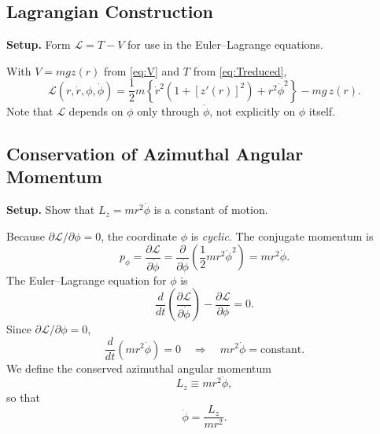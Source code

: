 \documentclass[11pt,letterpaper]{article}
\newcommand{\parhead}[1]{\par\medskip\noindent\textbf{#1}\ignorespaces}
\begin{document}
\subsection{Lagrangian Construction}
\label{sec:lagrangian}

\parhead{Setup.}
Form $\mathcal{L}=T-V$ for use in the Euler--Lagrange equations.

With $V=mgz(r)$ from \eqref{eq:V} and $T$ from \eqref{eq:Treduced},
\begin{equation}\label{eq:Lagrangian}
    \mathcal{L}(r,\dot{r},\phi,\dot{\phi})
    = \frac{1}{2}m\left\{\dot{r}^2\left(1 + [z'(r)]^2\right) + r^2\dot{\phi}^2\right\}
      - mg\,z(r).
\end{equation}
Note that $\mathcal{L}$ depends on $\phi$ only through $\dot{\phi}$, not explicitly on $\phi$ itself.

\subsection{Conservation of Azimuthal Angular Momentum}
\label{sec:Lz}

\parhead{Setup.}
Show that $L_z=mr^2\dot{\phi}$ is a constant of motion.

Because $\partial\mathcal{L}/\partial\phi=0$, the coordinate $\phi$ is \emph{cyclic}. The conjugate momentum is
\begin{equation}
    p_\phi = \frac{\partial\mathcal{L}}{\partial\dot{\phi}}
           = \frac{\partial}{\partial\dot{\phi}}
             \left(\frac{1}{2}m r^2 \dot{\phi}^2\right)
           = m r^2 \dot{\phi}.
\end{equation}
The Euler--Lagrange equation for $\phi$ is
\begin{equation}
    \frac{d}{dt}\left(\frac{\partial\mathcal{L}}{\partial\dot{\phi}}\right)
    - \frac{\partial\mathcal{L}}{\partial\phi} = 0.
\end{equation}
Since $\partial\mathcal{L}/\partial\phi=0$,
\begin{equation}
    \frac{d}{dt}(m r^2 \dot{\phi}) = 0
    \quad\Longrightarrow\quad
    m r^2 \dot{\phi} = \text{constant}.
\end{equation}
We define the conserved azimuthal angular momentum
\begin{equation}\label{eq:Lz}
    L_z \equiv m r^2 \dot{\phi},
\end{equation}
so that
\begin{equation}\label{eq:phidot}
    \dot{\phi} = \frac{L_z}{m r^2}.
\end{equation}
\end{document}
